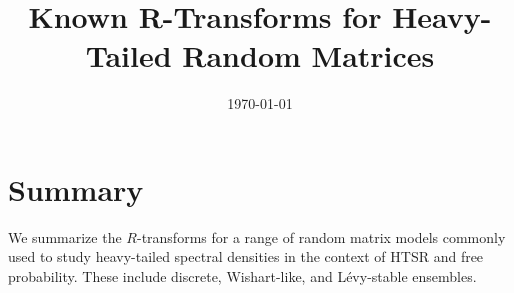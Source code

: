\documentclass[12pt]{article}
\title{Known R-Transforms for Heavy-Tailed Random Matrices}
\date{\today}
\begin{document}
\maketitle

\section*{Summary}
We summarize the $R$-transforms for a range of random matrix models commonly used to study heavy-tailed spectral densities in the context of HTSR and free probability. These include discrete, Wishart-like, and Lévy-stable ensembles.


\pagebreak

\end{document}
